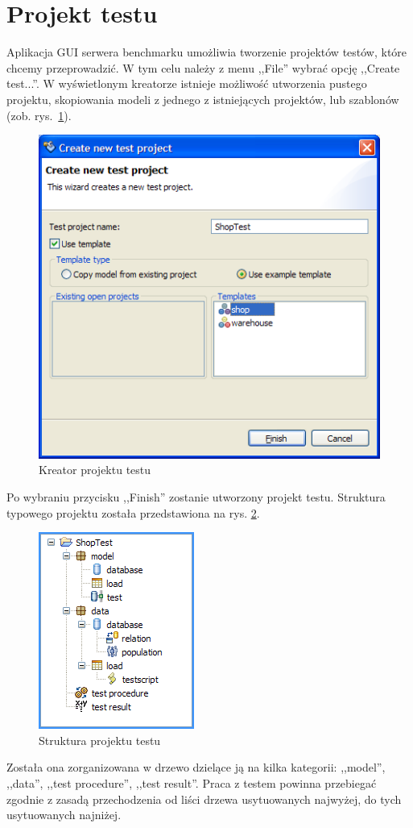 \section{Projekt testu}
Aplikacja GUI serwera benchmarku umożliwia tworzenie projektów testów,
które chcemy przeprowadzić. W tym celu należy z menu ,,File'' wybrać opcję ,,Create test...''.
W wyświetlonym kreatorze istnieje możliwość utworzenia pustego projektu, skopiowania modeli
z jednego z istniejących projektów, lub szablonów (zob. rys.~\ref{rys:createproject}).
\begin{figure}[h]
\begin{center}
\includegraphics[width=0.5\linewidth]{figures/gui/07.png}
\end{center}
\caption{Kreator projektu testu}\label{rys:createproject}
\end{figure}
Po wybraniu przycisku ,,Finish'' zostanie utworzony projekt testu. Struktura typowego projektu 
została przedstawiona na rys. \ref{rys:testprojectstr}.
\begin{figure}[h]
\begin{center}
\includegraphics[width=0.3\linewidth]{figures/gui/10.png}
\end{center}
\caption{Struktura projektu testu}\label{rys:testprojectstr}
\end{figure}
Została ona zorganizowana w drzewo dzielące ją na kilka kategorii:
,,model'', ,,data'', ,,test procedure'', ,,test result''. Praca z testem powinna przebiegać
zgodnie z zasadą przechodzenia od liści drzewa usytuowanych najwyżej, do tych usytuowanych najniżej.

